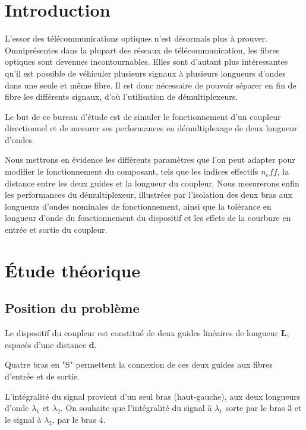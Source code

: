 \documentclass[a4paper,11pt]{report}
\begin{document}


\chapter*{Introduction}

L'essor des télécommunications optiques n'est désormais plus à prouver. Omniprésentes dans la plupart des réseaux de télécommunication, les fibres optiques sont devenues incontournables. Elles sont d'autant plus intéressantes qu'il est possible de véhiculer plusieurs signaux à plusieurs longueurs d'ondes dans une seule et même fibre. \newline
Il est donc nécessaire de pouvoir séparer en fin de fibre les différents signaux, d'où l'utilisation de démultiplexeurs.

Le but de ce bureau d'étude est de simuler le fonctionnement d'un coupleur directionnel et de mesurer ses performances en démultiplexage de deux longueur d'ondes.

Nous mettrons en évidence les différents paramètres que l'on peut adapter pour modifier le fonctionnement du composant, tels que les indices effectifs $n_eff$, la distance entre les deux guides et la longueur du coupleur.
\newline
\indent Nous mesurerons enfin les performances du démultiplexeur, illustrées par l'isolation des deux bras aux longueurs d'ondes nominales de fonctionnement, ainsi que la tolérance en longueur d'onde du fonctionnement du dispositif et les effets de la courbure en entrée et sortie du coupleur.


\chapter{Étude théorique}

\section{Position du problème}
Le dispositif du coupleur est constitué de deux guides linéaires de longueur \textbf{L}, espacés d'une distance \textbf{d}.

Quatre bras en "S" permettent la connexion de ces deux guides aux fibres d'entrée et de sortie.

L'intégralité du signal provient d'un seul bras (haut-gauche), aux deux longueurs d'onde $\lambda_1$ et $\lambda_2$. On souhaite que l'intégralité du signal à $\lambda_1$ sorte par le bras 3 et le signal à $\lambda_2$, par le bras 4.
\end{document}
